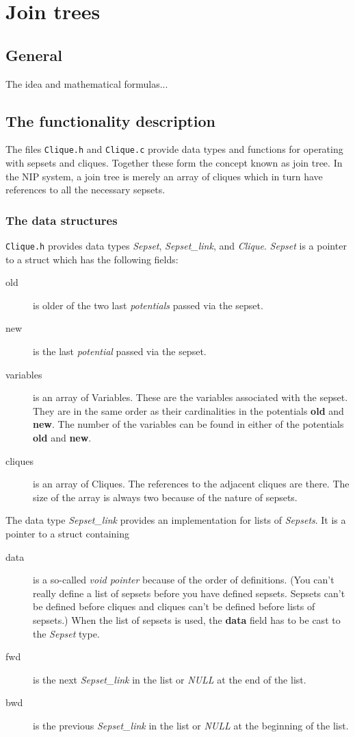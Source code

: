 \documentclass[12pt,a4paper]{report}
\begin{document}
\newpage
\section{Join trees} %
\subsection{General}

The idea and mathematical formulas...

\subsection{The functionality description}
The files \verb+Clique.h+ and \verb+Clique.c+ provide data types and 
functions for operating with sepsets and cliques. Together these form
the concept known as join tree. In the NIP system, a join tree is
merely an array of cliques which in turn have references to all the
necessary sepsets.

\subsubsection{The data structures}
\verb+Clique.h+ provides data types {\it Sepset}, {\it Sepset\_link}, 
and {\it Clique}. {\it Sepset} is a pointer to a struct which has the
following fields:
\begin{description}
\item[old] is older of the two last {\it potentials} passed via the sepset.
\item[new] is the last {\it potential} passed via the sepset.
\item[variables] is an {array of Variables}. These are the variables
associated with the sepset. They are in the same order as their
cardinalities in the potentials \textbf{old} and \textbf{new}. 
The number of the variables can be found in either of the potentials 
\textbf{old} and \textbf{new}.
\item[cliques] is an {array of Cliques}. The references to the
adjacent cliques are there. The size of the array is always two
because of the nature of sepsets.
\end{description}

The data type {\it Sepset\_link} provides an implementation for lists
of {\it Sepsets}. It is a pointer to a struct containing
\begin{description}
\item[data] is a so-called {\it void pointer} because of the order of
definitions. (You can't really define a list of sepsets before you
have defined sepsets. Sepsets can't be defined before cliques and
cliques can't be defined before lists of sepsets.) When the list of
sepsets is used, the \textbf{data} field has to be cast to the 
{\it Sepset} type. 
\item[fwd] is the next {\it Sepset\_link} in the list or {\it NULL} at
the end of the list.
\item[bwd] is the previous {\it Sepset\_link} in the list or 
{\it NULL} at the beginning of the list.

\end{description}
\end{document}
